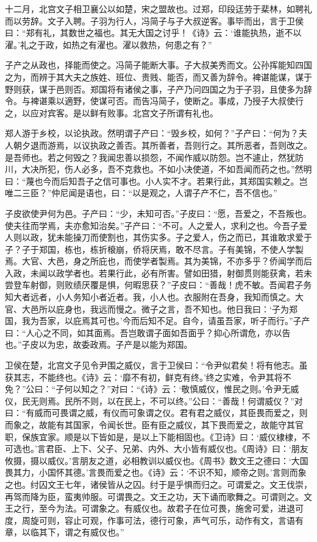 \documentclass[a4paper,12pt,UTF8,twoside]{ctexbook}
\begin{document}
十二月，北宫文子相卫襄公以如楚，宋之盟故也。过郑，印段迋劳于棐林，如聘礼而以劳辞。文子入聘。子羽为行人，冯简子与子大叔逆客。事毕而出，言于卫侯曰：“郑有礼，其数世之福也。其无大国之讨乎！《诗》云：‘谁能执热，逝不以濯。’礼之于政，如热之有濯也。濯以救热，何患之有？”

子产之从政也，择能而使之。冯简子能断大事。子大叔美秀而文。公孙挥能知四国之为，而辨于其大夫之族姓、班位、贵贱、能否，而又善为辞令。裨谌能谋，谋于野则获，谋于邑则否。郑国将有诸侯之事，子产乃问四国之为于子羽，且使多为辞令。与裨谌乘以適野，使谋可否。而告冯简子，使断之。事成，乃授子大叔使行之，以应对宾客。是以鲜有败事。北宫文子所谓有礼也。

郑人游于乡校，以论执政。然明谓子产曰：“毁乡校，如何？”子产曰：“何为？夫人朝夕退而游焉，以议执政之善否。其所善者，吾则行之。其所恶者，吾则改之。是吾师也。若之何毁之？我闻忠善以损怨，不闻作威以防怨。岂不遽止，然犹防川，大决所犯，伤人必多，吾不克救也。不如小决使道，不如吾闻而药之也。”然明曰：“蔑也今而后知吾子之信可事也。小人实不才。若果行此，其郑国实赖之。岂唯二三臣？”仲尼闻是语也，曰：“以是观之，人谓子产不仁，吾不信也。”

子皮欲使尹何为邑。子产曰：“少，未知可否。”子皮曰：“愿，吾爱之，不吾叛也。使夫往而学焉，夫亦愈知治矣。”子产曰：“不可。人之爱人，求利之也。今吾子爱人则以政，犹未能操刀而使割也，其伤实多。子之爱人，伤之而已，其谁敢求爱于子？子于郑国，栋也，栋折榱崩，侨将厌焉，敢不尽言。子有美锦，不使人学製焉。大官、大邑，身之所庇也，而使学者製焉。其为美锦，不亦多乎？侨闻学而后入政，未闻以政学者也。若果行此，必有所害。譬如田猎，射御贯则能获禽，若未尝登车射御，则败绩厌覆是惧，何暇思获？”子皮曰：“善哉！虎不敏。吾闻君子务知大者远者，小人务知小者近者。我，小人也。衣服附在吾身，我知而慎之。大官、大邑所以庇身也，我远而慢之。微子之言，吾不知也。他日我曰：‘子为郑国，我为吾家，以庇焉其可也。’今而后知不足。自今，请虽吾家，听子而行。”子产曰：“人心之不同，如其面焉。吾岂敢谓子面如吾面乎？抑心所谓危，亦以告也。”子皮以为忠，故委政焉。子产是以能为郑国。

卫侯在楚，北宫文子见令尹围之威仪，言于卫侯曰：“令尹似君矣！将有他志。虽获其志，不能终也。《诗》云：‘靡不有初，鲜克有终。’终之实难，令尹其将不免？”公曰：“子何以知之？”对曰：“《诗》云：‘敬慎威仪，惟民之则。’令尹无威仪，民无则焉。民所不则，以在民上，不可以终。”公曰：“善哉！何谓威仪？”对曰：“有威而可畏谓之威，有仪而可象谓之仪。君有君之威仪，其臣畏而爱之，则而象之，故能有其国家，令闻长世。臣有臣之威仪，其下畏而爱之，故能守其官职，保族宜家。顺是以下皆如是，是以上下能相固也。《卫诗》曰：‘威仪棣棣，不可选也。’言君臣、上下、父子、兄弟、内外、大小皆有威仪也。《周诗》曰：‘朋友攸摄，摄以威仪。’言朋友之道，必相教训以威仪也。《周书》数文王之德曰：‘大国畏其力，小国怀其德。’言畏而爱之也。《诗》云：‘不识不知，顺帝之则。’言则而象之也。纣囚文王七年，诸侯皆从之囚。纣于是乎惧而归之。可谓爱之。文王伐崇，再驾而降为臣，蛮夷帅服。可谓畏之。文王之功，天下诵而歌舞之。可谓则之。文王之行，至今为法。可谓象之。有威仪也。故君子在位可畏，施舍可爱，进退可度，周旋可则，容止可观，作事可法，德行可象，声气可乐，动作有文，言语有章，以临其下，谓之有威仪也。”
\end{document}
